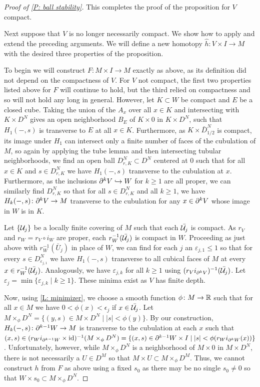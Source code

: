 \begin{proof}[Proof of \cref{P: ball stability}]
This completes the proof of the proposition for $V$ compact.


Next suppose that $V$ is no longer necessarily compact. We show how to apply and extend the preceding arguments. We will define a new homotopy $\hat h \colon V \times I \to M$ with the desired three properties of the proposition.

To begin we will construct $F \colon M \times I \to M$ exactly as above, as its definition did not depend on the compactness of $V$. For $V$ not compact, the first two properties listed above for $F$ will continue to hold, but the third relied on compactness and so will not hold any long in general. However, let
$K \subset W$ be compact and $E$ be a closed cube. Taking the union of the $A_x$ over all $x \in K$ and intersecting with $K \times D^N$ gives an open neighborhood $B_E$ of $K \times 0$ in $K \times D^N$, such that
 $H_1(-,s)$ is transverse to $E$ at all $x \in K$.
Furthermore, as $K \times \bar D^N_{1/2}$ is compact, its image under $H_1$ can intersect only a finite number of faces of the cubulation of $M$, so again by applying the tube lemma and then intersecting tubular neighborhoods, we find an open ball $D_{r,K}^N \subset D^N$ centered at $0$ such that for all $x \in K$ and $s \in D_{r,K}^N$ we have $H_1(-,s)$ transverse to the cubulation at $x$. Furthermore, as the inclusions $\partial^kV \hookrightarrow W$ for $k\geq 1$ are all proper, we can similarly find $D_{r,K}^N$ so that for all $s \in D_{r,K}^N$ and all $k\geq 1$, we have $H_k(-,s) \colon \partial^kV \to M$ transverse to the cubulation for any $x \in \partial^{k}V$ whose image in $W$ is in $K$.

 Let $\{\mathcal{U}_j\}$ be a locally finite covering of $M$ such that each $\bar{\mathcal{U}_j}$ is compact. As $r_V$ and $r_W = r_V \circ i_{W}$ are proper, each $r^{-1}_W(\bar {\mathcal{U}_j})$ is compact in $W$. Proceeding as just above with $r_W^{-1}(\bar U_j)$ in place of $W$, we can find for each $j$ an $\varepsilon_{j,1}\leq 1$ so that for every $s \in D^N_{\varepsilon_{j,1}}$ we have $H_1(-,s)$ transverse to all cubical faces of $M$ at every $x \in r^{-1}_W(\bar {\mathcal{U}_j})$. Analogously, we have $\varepsilon_{j,k}$ for all $k\geq 1$ using $(r_Vi_{\partial^kV})^{-1}(\bar {\mathcal{U}_j})$. Let $\varepsilon_j = \min\{\varepsilon_{j,k} \mid k\geq 1\}$. These minima exist as $V$ has finite depth.

Now, using \cref{L: minimizer}, we choose a smooth function $\phi \colon M \to \mathbb{R}$ such that for all $x \in M$ we have $0<\phi(x)<\epsilon_j$ if $x \in \bar{\mathcal{U}_j}$. Let $M\times_\phi D^N = \{(y,s) \in M \times D^N \mid |s|<\phi(y)\}$. By our construction, $H_k(-,s) \colon \partial^{k-1}W \to M$ is transverse to the cubulation at each $x$ such that $(x,s)\in(r_Wi_{\partial^{k-1}W} \times \mathrm{id})^{-1}(M\times_\phi D^N) = \{(x,s) \in \partial^{k-1}W \times I \mid |s|<\phi(r_Wi_{\partial^kW}(x))\}$. Unfortunately, however, while $M\times_\phi D^N$ is a neighborhood of $M \times 0$ in $M \times D^N$, there is not necessarily a $U \in D^M$ so that $M \times U \subset M\times_\phi D^M$. Thus,
we cannot construct $h$ from $F$ as above using a fixed $s_0$ as there may be no single $s_0\neq 0$ so that $W \times s_0 \subset M\times_\phi D^N$.



\end{proof}
